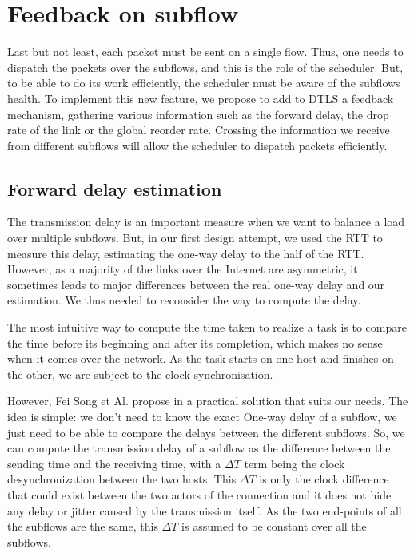 \section{Feedback on subflow}
\label{sec:mpdtls-feedback}

Last but not least, each packet must be sent on a single flow. Thus, one needs to dispatch the packets over the subflows, and this is the role of the scheduler. But, to be able to do its work efficiently, the scheduler must be aware of the subflows health. To implement this new feature, we propose to add to DTLS a feedback mechanism, gathering various information such as the forward delay, the drop rate of the link or the global reorder rate. Crossing the information we receive from different subflows will allow the scheduler to dispatch packets efficiently.

\subsection{Forward delay estimation}
\label{sec:forward-delay}
The transmission delay is an important measure when we want to balance a load over multiple subflows. But, in our first design attempt, we used the RTT to measure this delay, estimating the one-way delay to the half of the RTT. However, as a majority of the links over the Internet are asymmetric, it sometimes leads to major differences between the real one-way delay and our estimation. We thus needed to reconsider the way to compute the delay.

The most intuitive way to compute the time taken to realize a task is to compare the time before its beginning and after its completion, which makes no sense when it comes over the network. As the task starts on one host and finishes on the other, we are subject to the clock synchronisation.

However, Fei Song et Al. propose in \cite{song2009estimator} a practical solution that suits our needs. The idea is simple: we don't need to know the exact One-way delay of a subflow, we just need to be able to compare the delays between the different subflows. So, we can compute the transmission delay of a subflow as the difference between the sending time and the receiving time, with a $\Delta T$ term being the clock desynchronization between the two hosts. This $\Delta T$ is only the clock difference that could exist between the two actors of the connection and it does not hide any delay or jitter caused by the transmission itself. As the two end-points of all the subflows are the same, this $\Delta T$ is assumed to be constant over all the subflows.

